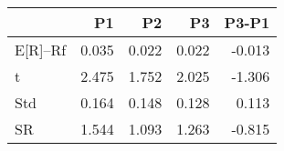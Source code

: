 \begin{tabular}{lrrrr}
\toprule
 & P1 & P2 & P3 & P3-P1 \\
\midrule
E[R]--Rf & 0.035 & 0.022 & 0.022 & -0.013 \\
t & 2.475 & 1.752 & 2.025 & -1.306 \\
Std & 0.164 & 0.148 & 0.128 & 0.113 \\
SR & 1.544 & 1.093 & 1.263 & -0.815 \\
\bottomrule
\end{tabular}
